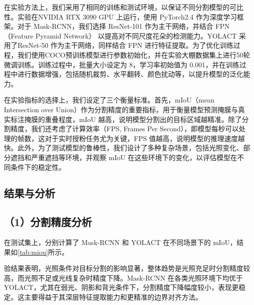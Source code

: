 在实验方法上，我们采用了相同的训练和测试环境，以保证不同分割模型的可比性。实验在NVIDIA RTX 3090 GPU 上运行，使用 PyTorch2.4 作为深度学习框架。对于 Mask-RCNN，我们选择 ResNet-101 作为主干网络，并结合 FPN（Feature Pyramid Network） 以提高对不同尺度花朵的检测能力。YOLACT 采用了ResNet-50 作为主干网络，同样结合 FPN 进行特征提取。为了优化训练过程，我们使用COCO预训练模型进行参数初始化，并在实验大棚数据集上进行50轮微调训练。训练过程中，批量大小设定为 8，学习率初始值为 0.001，并在训练过程中进行数据增强，包括随机裁剪、水平翻转、颜色扰动等，以提升模型的泛化能力。

在实验指标的选择上，我们设定了三个衡量标准。首先，mIoU（mean Intersection over Union）作为分割精度的重要指标，用于衡量模型预测掩膜与真实标注掩膜的重叠程度，mIoU 越高，说明模型分割出的目标区域越精准。除了分割精度，我们还考虑了计算效率（FPS, Frames Per Second），即模型每秒可以处理的帧数，这对于实时授粉任务尤为关键，FPS 值越高，说明模型的推理速度越快。此外，为了测试模型的鲁棒性，我们设计了多种复杂场景，包括光照变化、部分遮挡和严重遮挡等环境，并观察 mIoU 在这些环境下的变化，以评估模型在不同条件下的稳定性。

\subsection{结果与分析} 
\subsection*{（1）分割精度分析} 
\begin{table}[htbp]
	\caption[不同光照强度下的 MIoU 结果]{不同光照强度下的 MIoU 结果}
	\label{tab:miou}
\end{table}
在测试集上，分别计算了 Mask-RCNN 和 YOLACT 在不同场景下的 mIoU，结果如\cref{tab:miou}所示。


验结果表明，光照条件对目标分割的影响显著，整体趋势是光照充足时分割精度较高，而光照不足或光线复杂时精度下降。Mask-RCNN 在各类光照环境下均优于 YOLACT，尤其在弱光、阴影和背光条件下，分割精度下降幅度较小，表现更稳定。这主要得益于其深层特征提取能力和更精准的边界对齐方法。

